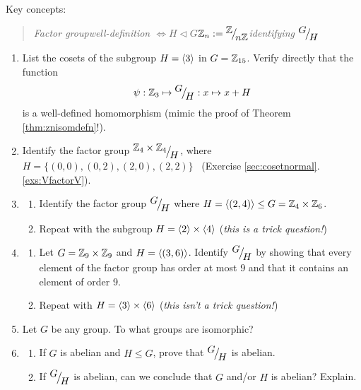 \begin{exercises}
Key concepts:
\begin{quote}
	\emph{Factor group\qquad well-definition $\iff H\triangleleft G$\qquad $\mathbb{Z}_n:={}^{\textstyle {\mathbb{Z}}}\!\big/_{\textstyle \!{n\mathbb{Z}}}$\qquad identifying ${}^{\textstyle {G}}\!\big/_{\textstyle \!{H}}$}
\end{quote}

\begin{enumerate}
  \item List the cosets of the subgroup $H=\left\langle 3\right\rangle$ in $G=\mathbb{Z}_{15}$. Verify directly that the function
  \[\psi:\mathbb{Z}_3\mapsto {}^{\textstyle {G}}\!\big/_{\textstyle \!{H}}:x\mapsto x+H\]
  is a well-defined homomorphism (mimic the proof of Theorem \ref{thm:znisomdefn}!).

	
	\item Identify the factor group ${}^{\textstyle {\mathbb{Z}_4\times\mathbb{Z}_4}}\!\big/_{\textstyle \!{H}}$, where $H=\{(0,0),(0,2),(2,0),(2,2)\}$ \ (Exercise \ref*{sec:cosetnormal}.\ref{exs:VfactorV}).
	
	
	\item\begin{enumerate}
	  \item Identify the factor group ${}^{\textstyle {G}}\!\big/_{\textstyle \!{H}}$ where $H=\left\langle (2,4)\right\rangle\le G=\mathbb{Z}_4\times\mathbb{Z}_6$.
	  \item Repeat with the subgroup $H=\left\langle 2\right\rangle\times\left\langle 4\right\rangle$ (\emph{this is a trick question!})
	\end{enumerate}
	

	
	
	\item\begin{enumerate}
	  \item Let $G=\mathbb{Z}_9\times\mathbb{Z}_9$ and $H=\left\langle (3,6)\right\rangle$. Identify ${}^{\textstyle {G}}\!\big/_{\textstyle \!{H}}$ by showing that every element of the factor group has order at most 9 and that it contains an element of order 9.
	  \item Repeat with $H=\left\langle 3\right\rangle\times\left\langle 6\right\rangle$ (\emph{this isn't a trick question!})
	\end{enumerate}
  
  
	\item Let $G$ be any group. To what groups are  isomorphic?
	

	\item\label{exs:gmodhabelian}\begin{enumerate}
	  \item If $G$ is abelian and $H\le G$, prove that $\smash[b]{{}^{\textstyle {G}}\!\big/_{\textstyle \!{H}}}$ is abelian.
	  \item If ${}^{\textstyle {G}}\!\big/_{\textstyle \!{H}}$ is abelian, can we conclude that $G$ and/or $H$ is abelian? Explain.
	\end{enumerate}
	


\end{enumerate}
\end{exercises}

